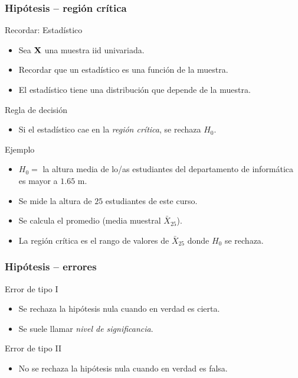 \documentclass[table]{beamer}
\begin{document}
\begin{frame}
    \frametitle{Hipótesis -- región crítica}
    \begin{block}{Recordar: Estadístico}
        \begin{itemize}
            \item Sea $\mathbf{X}$ una muestra iid univariada.
            \item Recordar que un estadístico es una función de la muestra.
            \item El estadístico tiene una distribución que depende de la muestra.
        \end{itemize}
    \end{block}
    \begin{block}{Regla de decisión}
        \begin{itemize}
            \item Si el estadístico cae en la \emph{región crítica}, se rechaza $H_{0}$.
        \end{itemize}
    \end{block}
    \begin{exampleblock}{Ejemplo}
        \begin{itemize}
            \item $H_{0} =$ la altura media de lo/as estudiantes del departamento de informática es mayor a $1.65$ m.
            \item Se mide la altura de $25$ estudiantes de este curso.
            \item Se calcula el promedio (media muestral $\bar{X}_{25}$).
            \item La región crítica es el rango de valores de $\bar{X}_{25}$ donde $H_{0}$ se rechaza.
        \end{itemize}
    \end{exampleblock}
\end{frame}

\begin{frame}
    \frametitle{Hipótesis -- errores}
    \begin{block}{Error de tipo I}
        \begin{itemize}
            \item Se rechaza la hipótesis nula cuando en verdad es cierta.
            \item Se suele llamar \emph{nivel de significancia}.
        \end{itemize}
    \end{block}
    \begin{block}{Error de tipo II}
        \begin{itemize}
            \item No se rechaza la hipótesis nula cuando en verdad es falsa.
        \end{itemize}
    \end{block}
\end{frame}
\end{document}
